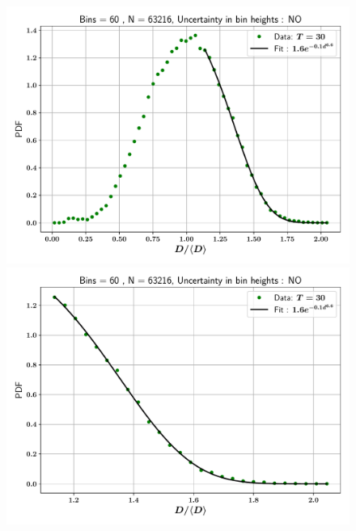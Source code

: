 \begin{figure}
\centering
\includegraphics{plots/drop_stats/linear_tail_fit_uncertainty_no.pdf} \\
\includegraphics{plots/drop_stats/linear_zoom_tail_fit_uncertainty_no.pdf} \\ 
\caption{\blindtext}
\label{linear_fits_wo}
\end{figure}


